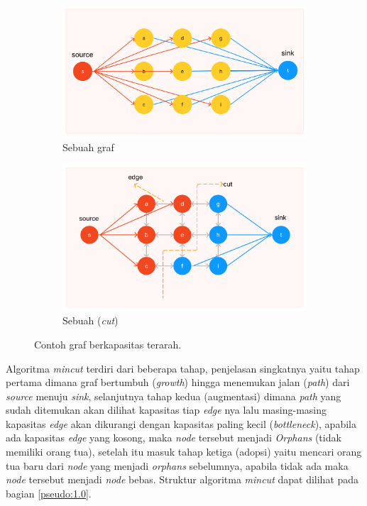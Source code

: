 \begin{figure}[H]
	\centering
	  \begin{subfigure}{.5\textwidth}
		\centering{}
		\includegraphics[width=\textwidth]{gambar/cth-graph-1.png}
		\caption{Sebuah graf}
	  \end{subfigure} \hfill
	  \begin{subfigure}{.5\textwidth}
		\centering{}
		\includegraphics[width=\textwidth]{gambar/cth-graph-2.png}
		\caption{Sebuah (\emph{cut})}
	  \end{subfigure}  
	\caption{
	  Contoh graf berkapasitas terarah.
	  }
	\label{gambar:3.9}
  
  \end{figure}

Algoritma \emph{mincut} terdiri dari beberapa tahap, penjelasan singkatnya yaitu 
tahap pertama dimana graf bertumbuh (\emph{growth}) hingga menemukan jalan (\emph{path}) 
dari \emph{source} menuju \emph{sink}, selanjutnya tahap kedua (augmentasi) dimana 
\emph{path} yang sudah ditemukan akan dilihat kapasitas tiap \emph{edge} nya lalu 
masing-masing kapasitas \emph{edge} akan dikurangi dengan kapasitas paling kecil 
(\emph{bottleneck}), apabila ada kapasitas \emph{edge} yang kosong, maka \emph{node} 
tersebut menjadi \emph{Orphans} (tidak memiliki orang tua), setelah itu masuk tahap 
ketiga (adopsi) yaitu mencari orang tua baru dari \emph{node} yang menjadi \emph{orphans} 
sebelumnya, apabila tidak ada maka \emph{node} tersebut menjadi \emph{node} bebas. 
Struktur algoritma \emph{mincut} dapat dilihat pada bagian \ref{pseudo:1.0}. 

